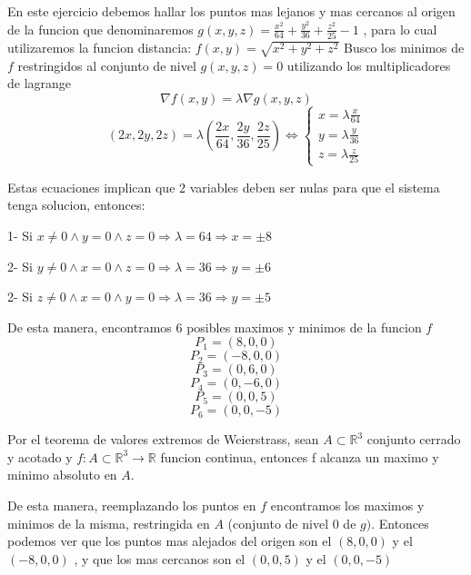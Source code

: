 \begin{solution}
    En este ejercicio debemos hallar los puntos mas lejanos y mas cercanos al origen de la funcion que denominaremos $g(x,y,z)=\frac{x^2}{64}+\frac{y^2}{36}+\frac{z^2}{25}-1$ , para lo cual utilizaremos la funcion distancia: $f(x,y)=\sqrt{x^2+y^2+z^2}$ \newline Busco los minimos de $f$ restringidos al conjunto de nivel $g(x,y,z)=0$ utilizando los multiplicadores de lagrange
\[
        \nabla f(x,y)=\lambda \nabla g(x,y,z)
    \]
    \[
        (2x,2y,2z)=\lambda (\frac{2x}{64},\frac{2y}{36},\frac{2z}{25}) \iff \begin{cases}
            x = \lambda\frac{x}{64}\\
            y = \lambda\frac{y}{36}\\
            z = \lambda\frac{z}{25}
        \end{cases}
    \]
    
    Estas ecuaciones implican que 2 variables deben ser nulas para que el sistema tenga solucion, entonces:

1- Si $x\neq 0 \land y=0 \land z=0 \Rightarrow \lambda=64  \Rightarrow x=\pm 8$ 

2- Si $y\neq 0 \land x=0 \land z=0 \Rightarrow \lambda=36  \Rightarrow y=\pm 6$ 

2- Si $z\neq 0 \land x=0 \land y=0 \Rightarrow \lambda=36  \Rightarrow y=\pm 5$ 

    De esta manera, encontramos 6 posibles maximos y minimos de la funcion $f$
\[
        P_1=(8,0,0) 
         \]
         \[
        P_2=(-8,0,0) 
         \]
        \[
        P_3=(0,6,0) 
         \]
         \[
        P_4=(0,-6,0) 
         \]
         \[
        P_5=(0,0,5) 
         \]
         \[
        P_6=(0,0,-5) 
    \]
    
    Por el teorema de valores extremos de Weierstrass, sean $A \subset \mathbb{R}^3$ conjunto cerrado y acotado y $f:A\subset\mathbb{R}^3\rightarrow\mathbb{R} $ funcion continua, entonces f alcanza un maximo y minimo absoluto en $A$.
    
    De esta manera, reemplazando los puntos en $f$ encontramos los maximos y minimos de la misma, restringida en $A$ (conjunto de nivel 0 de $g)$. Entonces podemos ver que los puntos mas alejados del origen son el $(8,0,0)$ y el $(-8,0,0)$ , y que los mas cercanos son el $(0,0,5)$  y el $(0,0,-5)$ \newline
    

\end{solution}
